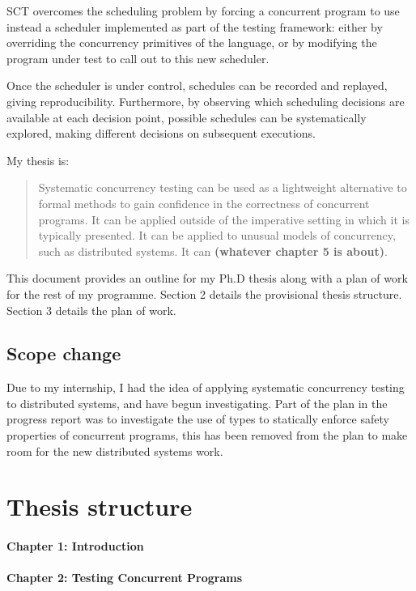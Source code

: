 \documentclass{article}
\begin{document}
SCT overcomes the scheduling problem by forcing a concurrent program
to use instead a scheduler implemented as part of the testing
framework: either by overriding the concurrency primitives of the
language, or by modifying the program under test to call out to this
new scheduler.

Once the scheduler is under control, schedules can be recorded and
replayed, giving reproducibility. Furthermore, by observing which
scheduling decisions are available at each decision point, possible
schedules can be systematically explored, making different decisions
on subsequent executions.

My thesis is:

\begin{quote}
  Systematic concurrency testing can be used as a lightweight
  alternative to formal methods to gain confidence in the correctness
  of concurrent programs. It can be applied outside of the imperative
  setting in which it is typically presented. It can be applied to
  unusual models of concurrency, such as distributed systems. It can
  \textbf{(whatever chapter 5 is about)}.
\end{quote}

This document provides an outline for my Ph.D thesis along with a plan
of work for the rest of my programme. Section 2 details the
provisional thesis structure. Section 3 details the plan of work.

\subsection{Scope change}

Due to my internship, I had the idea of applying systematic
concurrency testing to distributed systems, and have begun
investigating. Part of the plan in the progress report was to
investigate the use of types to statically enforce safety properties
of concurrent programs, this has been removed from the plan to make
room for the new distributed systems work.

\section{Thesis structure}

\paragraph{Chapter 1: Introduction}

\paragraph{Chapter 2: Testing Concurrent Programs}
\end{document}
